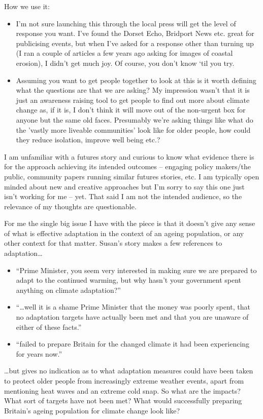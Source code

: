 How we use it:
\begin{itemize}
	\item I'm not sure launching this through the local press will get the level of response you want. I've found the Dorset Echo, Bridport News etc. great for publicising events, but when I've asked for a response other than turning up (I ran a couple of articles a few years ago asking for images of coastal erosion), I didn't get much joy. Of course, you don't know `til you try.
	\item Assuming you want to get people together to look at this is it worth defining what the questions are that we are asking? My impression wasn't that it is just an awareness raising tool to get people to find out more about climate change as, if it is, I don't think it will move out of the non-urgent box for anyone but the same old faces.  Presumably we're asking things like what do the 'vastly more liveable communities' look like for older people, how could they reduce isolation, improve well being etc.?
\end{itemize}

I am unfamiliar with a futures story and curious to know what evidence there is for the approach achieving its intended outcomes -- engaging policy makers/the public, community papers running similar futures stories, etc. I am typically open minded about new and creative approaches but I'm sorry to say this one just isn't working for me -- yet. That said I am not the intended audience, so the relevance of my thoughts are questionable.

For me the single big issue I have with the piece is that it doesn't give any sense of what is effective adaptation in the context of an ageing population, or any other context for that matter. Susan's story makes a few references to adaptation\ldots

\begin{itemize}
	\item ``Prime Minister, you seem very interested in making sure we are prepared to adapt to the continued warming, but why hasn't your government spent anything on climate adaptation?''
	\item ``\ldots well it is a shame Prime Minister that the money was poorly spent, that no adaptation targets have actually been met and that you are unaware of either of these facts.''
	\item ``failed to prepare Britain for the changed climate it had been experiencing for years now.''
\end{itemize}
\dots but gives no indication as to what adaptation measures could have been taken to protect older people from increasingly extreme weather events, apart from mentioning heat waves and an extreme cold snap. So what are the impacts? What sort of targets have not been met? What would successfully preparing Britain's ageing population for climate change look like?

